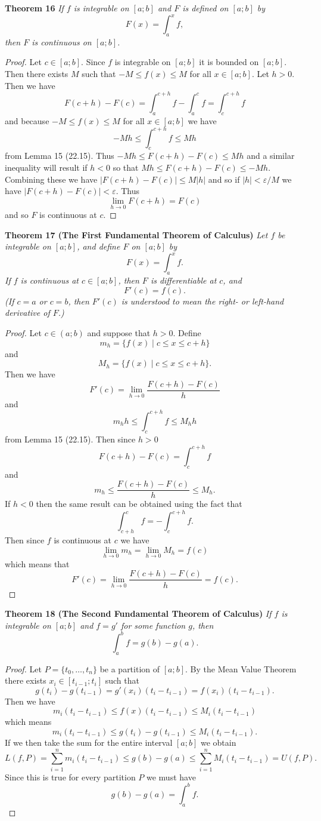 \documentclass{article}
\begin{document}
\begin{flushleft}
\textbf{Theorem 16}
\textsl{If $f$ is integrable on $[a;b]$ and $F$ is defined on $[a;b]$ by
\[
F(x) = \int_a^x f,
\]
then $F$ is continuous on $[a;b]$.}
\begin{proof}
Let $c \in [a;b]$. Since $f$ is integrable on $[a;b]$ it is bounded on $[a;b]$. Then there exists $M$ such that $-M \leq f(x) \leq M$ for all $x \in [a;b]$. Let $h > 0$. Then we have
\[
F(c+h) - F(c) = \int_a^{c+h} f - \int_a^c f = \int_c^{c+h} f
\]
and because $-M \leq f(x) \leq M$ for all $x \in [a;b]$ we have
\[
-M h \leq \int_c^{c+h} f \leq M h
\]
from Lemma 15 (22.15). Thus $-Mh \leq F(c+h) - F(c) \leq Mh$ and a similar inequality will result if $h < 0$ so that $Mh \leq F(c+h) - F(c) \leq -Mh$. Combining these we have $|F(c+h) - F(c)| \leq M |h|$ and so if $|h| < \varepsilon / M$ we have $|F(c+h) - F(c)| < \varepsilon$. Thus
\[
\lim_{h \rightarrow 0} F(c+h) = F(c)
\]
and so $F$ is continuous at $c$.
\end{proof}

\textbf{Theorem 17 (The First Fundamental Theorem of Calculus)}
\textsl{Let $f$ be integrable on $[a;b]$, and define $F$ on $[a;b]$ by
\[
F(x) = \int_a^x f.
\]
If $f$ is continuous at $c \in [a;b]$, then $F$ is differentiable at $c$, and
\[
F'(c) = f(c).
\]
(If $c=a$ or $c=b$, then $F'(c)$ is understood to mean the right- or left-hand derivative of $F$.)}
\begin{proof}
Let $c \in (a;b)$ and suppose that $h > 0$. Define
\[
m_h = \{f(x) \mid c \leq x \leq c+h\}
\]
and
\[
M_h = \{f(x) \mid c \leq x \leq c+h\}.
\]
Then we have
\[
F'(c) = \lim_{h \rightarrow 0} \frac{F(c+h) - F(c)}{h}
\]
and
\[
m_h h \leq \int_c^{c+h} f \leq M_h h
\]
from Lemma 15 (22.15). Then since $h > 0$
\[
F(c+h) - F(c) = \int_c^{c+h} f
\]
and
\[
m_h \leq \frac{F(c+h) - F(c)}{h} \leq M_h.
\]
If $h < 0$ then the same result can be obtained using the fact that
\[
\int_{c+h}^c f = - \int_c^{c+h} f.
\]
Then since $f$ is continuous at $c$ we have
\[
\lim_{h \rightarrow 0} m_h = \lim_{h \rightarrow 0} M_h = f(c)
\]
which means that
\[
F'(c) = \lim_{h \rightarrow 0} \frac{F(c+h) - F(c)}{h} = f(c).
\]
\end{proof}

\textbf{Theorem 18 (The Second Fundamental Theorem of Calculus)}
\textsl{If $f$ is integrable on $[a;b]$ and $f=g'$ for some function $g$, then
\[
\int_a^b f = g(b)-g(a).
\]}
\begin{proof}
Let $P = \{t_0, \dots , t_n\}$ be a partition of $[a;b]$. By the Mean Value Theorem there exists $x_i \in [t_{i-1}; t_i]$ such that
\[
g(t_i) - g(t_{i-1}) = g'(x_i) (t_i-t_{i-1}) = f(x_i) (t_i-t_{i-1}).
\]
Then we have
\[
m_i (t_i-t_{i-1}) \leq f(x) (t_i-t_{i-1}) \leq M_i (t_i - t_{i-1})
\]
which means
\[
m_i (t_i-t_{i-1}) \leq g(t_i) - g(t_{i-1}) \leq M_i (t_i - t_{i-1}).
\]
If we then take the sum for the entire interval $[a;b]$ we obtain
\[
L(f,P) = \sum_{i=1}^n m_i (t_i-t_{i-1}) \leq g(b) - g(a) \leq \sum_{i=1}^n M_i (t_i-t_{i-1}) = U(f,P).
\]
Since this is true for every partition $P$ we must have
\[
g(b) - g(a) = \int_a^b f.
\]
\end{proof}

\end{flushleft}
\end{document}

